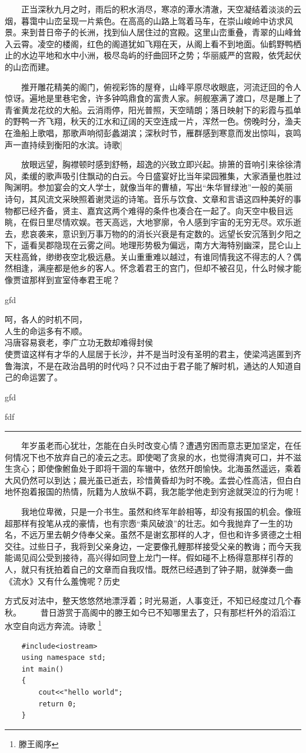 \documentclass{article}
\begin{document}
　　正当深秋九月之时，雨后的积水消尽，寒凉的潭水清澈，天空凝结着淡淡的云烟，暮霭中山峦呈现一片紫色。在高高的山路上驾着马车，在崇山峻岭中访求风景。来到昔日帝子的长洲，找到仙人居住过的宫殿。这里山峦重叠，青翠的山峰耸入云霄。凌空的楼阁，红色的阁道犹如飞翔在天，从阁上看不到地面。仙鹤野鸭栖止的水边平地和水中小洲，极尽岛屿的纡曲回环之势；华丽威严的宫殿，依凭起伏的山峦而建。

　　推开雕花精美的阁门，俯视彩饰的屋脊，山峰平原尽收眼底，河流迂回的令人惊讶。遍地是里巷宅舍，许多钟鸣鼎食的富贵人家。舸舰塞满了渡口，尽是雕上了青雀黄龙花纹的大船。云消雨停，阳光普照，天空晴朗；落日映射下的彩霞与孤单的野鸭一齐飞翔，秋天的江水和辽阔的天空连成一片，浑然一色。傍晚时分，渔夫在渔船上歌唱，那歌声响彻彭蠡湖滨；深秋时节，雁群感到寒意而发出惊叫，哀鸣声一直持续到衡阳的水滨。诗歌]

　　放眼远望，胸襟顿时感到舒畅，超逸的兴致立即兴起。排箫的音响引来徐徐清风，柔缓的歌声吸引住飘动的白云。今日盛宴好比当年梁园雅集，大家酒量也胜过陶渊明。参加宴会的文人学士，就像当年的曹植，写出“朱华冒绿池”一般的美丽 诗句，其风流文采映照着谢灵运的诗笔。音乐与饮食、文章和言语这四种美好的事物都已经齐备，贤主、嘉宾这两个难得的条件也凑合在一起了。向天空中极目远眺，在假日里尽情欢娱。苍天高远，大地寥廓，令人感到宇宙的无穷无尽。欢乐逝去，悲哀袭来，意识到万事万物的的消长兴衰是有定数的。远望长安沉落到夕阳之下，遥看吴郡隐现在云雾之间。地理形势极为偏远，南方大海特别幽深，昆仑山上天柱高耸，缈缈夜空北极远悬。关山重重难以越过，有谁同情我这不得志的人？偶然相逢，满座都是他乡的客人。怀念着君王的宫门，但却不被召见，什么时候才能像贾谊那样到宣室侍奉君王呢？

gfd 
\begin{minipage}[t]{8em}
呵，各人的时机不同，\\
人生的命运多有不顺。\\
冯唐容易衰老，李广立功无数却难得封侯\\
使贾谊这样有才华的人屈居于长沙，并不是当时没有圣明的君主，使梁鸿逃匿到齐鲁海滨，不是在政治昌明的时代吗？只不过由于君子能了解时机，通达的人知道自己的命运罢了。
\end{minipage}
gfd 


fdf\rule{10em}{1pt}
　　年岁虽老而心犹壮，怎能在白头时改变心情？遭遇穷困而意志更加坚定，在任何情况下也不放弃自己的凌云之志。即使喝了贪泉的水，也觉得清爽可口，并不滋生贪心；即使像鲋鱼处于即将干涸的车辙中，依然开朗愉快。北海虽然遥远，乘着大风仍然可以到达；晨光虽已逝去，珍惜黄昏却为时不晚。孟尝心性高洁，但白白地怀抱着报国的热情，阮籍为人放纵不羁，我怎能学他走到穷途就哭泣的行为呢！

　　我地位卑微，只是一介书生。虽然和终军年龄相等，却没有报国的机会。像班超那样有投笔从戎的豪情，也有宗悫“乘风破浪”的壮志。如今我抛弃了一生的功名，不远万里去朝夕侍奉父亲。虽然不是谢玄那样的人才，但也和许多贤德之士相交往。过些日子，我将到父亲身边，一定要像孔鲤那样接受父亲的教诲；而今天我能谒见阎公受到接待，高兴得如同登上龙门一样。假如碰不上杨得意那样引荐的人，就只有抚拍着自己的文章而自我叹惜。既然已经遇到了钟子期，就弹奏一曲《流水》又有什么羞愧呢？历史

方式反对法中，整天悠悠然地漂浮着；时光易逝，人事变迁，不知已经度过几个春秋。
　　昔日游赏于高阁中的滕王如今已不知哪里去了，只有那栏杆外的滔滔江水空自向远方奔流。诗歌
\footnote {滕王阁序}
\begin{verbatim}
    #include<iostream>
    using namespace std;
    int main()
    {
        cout<<"hello world";
        return 0;
    }

\end{verbatim}
\end{document}
